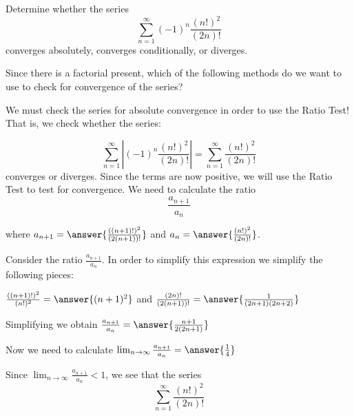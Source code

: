 \documentclass{ximera}
\author{Jason Miller}
\begin{document}
\begin{exercise}

Determine whether the series 
\[
\sum^{\infty}_{n=1} (-1)^n \frac{(n!)^2}{(2n)!}
\]
converges absolutely, converges conditionally, or diverges.

\begin{multipleChoice}
\end{multipleChoice}


\begin{hint}

Since there is a factorial present, which of the following methods do we want to use to check for convergence of the series?

\begin{multipleChoice}
\end{multipleChoice}

\begin{question}

We must check the series for absolute convergence in order to use the Ratio Test!  That is, we check whether the series:

\[
\sum^{\infty}_{n=1} \left| (-1)^n \frac{(n!)^2}{(2n)!} \right| = \sum^{\infty}_{n=1} \frac{(n!)^2}{(2n)!}
\]
converges or diverges.  Since the terms are now positive, we will use the Ratio Test to test for convergence. 
We need to calculate the ratio
\[
\frac{a_{n+1}}{a_n}
\]

where $a_{n+1}=\answer{ \frac{((n+1)!)^2 }{(2(n+1))!}}$ and $a_n=\answer{ \frac{(n!)^2}{(2n)!}}$. 

\begin{question}
Consider the ratio $\frac{a_{n+1}}{a_n}$. In order to simplify this expression we simplify the following pieces:

$ \frac{((n+1)!)^2}{(n!)^2}=\answer{(n+1)^2}$ and $\frac{ (2n)!}{(2(n+1))!}=\answer{\frac{1}{(2n+1)(2n+2)}}$

Simplifying we obtain $ \frac{a_{n+1}}{a_n} =\answer{  \frac{n+1}{2(2n+1)}}$

Now we need to calculate $\lim_{n\to \infty} \frac{a_{n+1}}{a_n} =\answer{ \frac{1}{4} }$

\begin{question}

Since $\lim_{n \to \infty} \frac{a_{n+1}}{a_n}<1$, we see that the series
\[
\sum^{\infty}_{n=1} \frac{(n!)^2}{(2n)!}
\]
\begin{multipleChoice}
\end{multipleChoice}


\end{question}
\end{question}
\end{question}
\end{hint}
\end{exercise}
\end{document}
